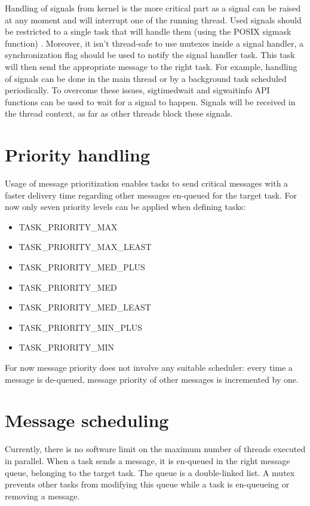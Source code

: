 \documentclass[a4paper,oneside]{report}
\begin{document}
Handling of signals from kernel is the more critical part as a signal can be raised
at any moment and will interrupt one of the running thread. Used signals should be restricted 
to a single task that will handle them (using the POSIX sigmask function) . Moreover, it isn't
thread-safe to use mutexes inside a signal handler, a synchronization flag should be used to
notify the signal handler task. This task will then send the appropriate message
to the right task. For example, handling of signals can be done in the main thread or by a background task
scheduled periodically.
To overcome these issues, sigtimedwait and sigwaitinfo API functions can be used
to wait for a signal to happen. Signals will be received in the thread context, as far as
other threads block these signals.

\section{Priority handling}

Usage of message prioritization enables tasks to send critical messages with a faster
delivery time regarding other messages en-queued for the target task.
For now only seven priority levels can be applied when defining tasks:
\begin{itemize}
\item TASK\_PRIORITY\_MAX
\item TASK\_PRIORITY\_MAX\_LEAST
\item TASK\_PRIORITY\_MED\_PLUS
\item TASK\_PRIORITY\_MED
\item TASK\_PRIORITY\_MED\_LEAST
\item TASK\_PRIORITY\_MIN\_PLUS
\item TASK\_PRIORITY\_MIN
\end{itemize}
For now message priority does not involve any suitable scheduler: every time a message is de-queued,
message priority of other messages is incremented by one.

\section{Message scheduling}
Currently, there is no software limit on the maximum number of threads executed in parallel.
When a task sends a message, it is en-queued in the right message queue, belonging to
the target task. The queue is a double-linked list. A mutex prevents other tasks
from modifying this queue while a task is en-queueing or removing a message.
\end{document}
